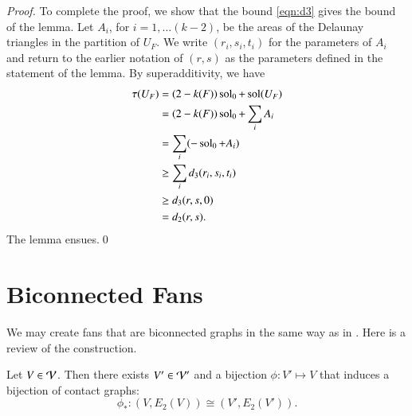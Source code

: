 \documentclass{llncs}
\begin{document}
\begin{proof}
To complete the proof, we show that the bound \eqref{eqn:d3} gives the bound of the lemma.
Let $A_i$, for $i=1,\ldots (k-2)$, be the areas of the Delaunay triangles in the partition of $U_F$.
We write $(r_i,s_i,t_i)$ for the parameters of $A_i$ and return to the earlier notation of $(r,s)$ 
as the parameters defined
in the statement of the lemma.
By superadditivity, we have
\begin{align*}
\tau(U_F) &= (2 - k(F))\operatorname{sol}_0 + \operatorname{sol}(U_F)\\ 
    &= (2 - k(F))\operatorname{sol}_0 + \sum_i A_i  \\
   &= \sum_i (-\operatorname{sol}_0 + A_i)\\
   &\ge \sum_i d_3(r_i,s_i,t_i) \\
   &\ge d_3(r,s,0)\\
   &=d_2(r,s).
\end{align*}
The lemma ensues.\qed
\end{proof}

\section{Biconnected Fans}


We may create  fans that are biconnected graphs in the same way as in
\cite{Hales:2006:DCG}.  Here is a review
of the construction.




\begin{lemma}\label{lemma:V'-bi} 
Let $V\in {\mathcal V}$.  Then there exists $V'\in {\mathcal V}'$ and a bijection 
 $\phi:V'\mapsto V$ that induces a bijection
  of contact graphs:
\[
\phi_*:(V,E_2(V)) \cong (V',E_2(V')).
\]
\end{lemma}
\end{document}
